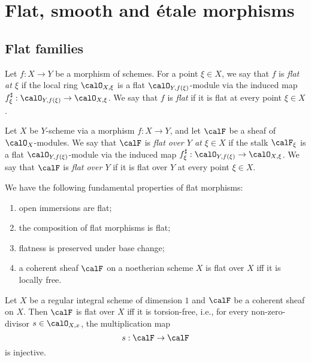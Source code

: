 \section{Flat, smooth and \'etale morphisms}


\subsection{Flat families}

    \begin{definition}\label{def:flat_morphisms}
        Let \(f:X\to Y\) be a morphism of schemes. 
        For a point \(\xi \in X\), we say that \(f\) is \emph{flat at \(\xi\)} if the local ring \(\calO_{X,\xi}\) is a flat \(\calO_{Y,f(\xi)}\)-module via the induced map \(f^\sharp_\xi:\calO_{Y,f(\xi)}\to \calO_{X,\xi}\).
        We say that \(f\) is \emph{flat} if it is flat at every point \(\xi \in X\).
    \end{definition}

    \begin{definition}\label{def:flat_sheaves_over_base}
        Let \(X\) be \(Y\)-scheme via a morphism \(f:X\to Y\), and let \(\calF\) be a sheaf of \(\calO_X\)-modules.
        We say that \(\calF\) is \emph{flat over \(Y\) at \(\xi \in X\)} if the stalk \(\calF_\xi\) is a flat \(\calO_{Y,f(\xi)}\)-module via the induced map \(f^\sharp_\xi:\calO_{Y,f(\xi)}\to \calO_{X,\xi}\).
        We say that \(\calF\) is \emph{flat over \(Y\)} if it is flat over \(Y\) at every point \(\xi \in X\).
    \end{definition}

    \begin{proposition}\label{prop:fundamental_properties_of_flat_morphism}
        We have the following fundamental properties of flat morphisms:
        \begin{enumerate}
            \item open immersions are flat;
            \item the composition of flat morphisms is flat;
            \item flatness is preserved under base change;
            \item a coherent sheaf \(\calF\) on a noetherian scheme \(X\) is flat over \(X\) iff it is locally free.
        \end{enumerate}
    \end{proposition}

    \begin{proposition}\label{prop:flat_over_curve_iff_torsion_free}
        Let \(X\) be a regular integral scheme of dimension \(1\) and \(\calF\) be a coherent sheaf on \(X\).
        Then \(\calF\) is flat over \(X\) iff it is torsion-free, i.e., for every non-zero-divisor \(s \in \calO_{X,x}\), the multiplication map
        \[
            s:\calF\to\calF
        \]
        is injective.
    \end{proposition}


